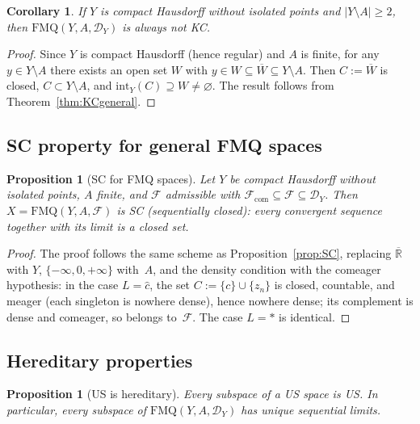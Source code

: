 \documentclass[11pt]{article}
\newtheorem{proposition}[theorem]{Proposition}
\newtheorem{corollary}[theorem]{Corollary}
\theoremstyle{definition}
\theoremstyle{remark}
\begin{document}
\begin{corollary}\label{cor:notKCgeneral}
If $Y$ is compact Hausdorff without isolated points and $|Y \setminus A| \geq 2$, then
$\mathrm{FMQ}(Y, A, \mathcal{D}_Y)$ is always not KC.
\end{corollary}
\begin{proof}
Since $Y$ is compact Hausdorff (hence regular) and $A$ is finite, for any
$y \in Y \setminus A$ there exists an open set $W$ with
$y \in W \subseteq \overline{W} \subseteq Y \setminus A$.
Then $C := \overline{W}$ is closed, $C \subset Y \setminus A$, and
$\mathrm{int}_Y(C) \supseteq W \neq \varnothing$.
The result follows from Theorem~\ref{thm:KCgeneral}.
\end{proof}

\subsection{SC property for general FMQ spaces}

\begin{proposition}[SC for FMQ spaces]\label{prop:SCgeneral}
Let $Y$ be compact Hausdorff without isolated points, $A$ finite, and
$\mathcal{F}$ admissible with
$\mathcal{F}_{\mathrm{com}} \subseteq \mathcal{F} \subseteq \mathcal{D}_Y$.
Then $X = \mathrm{FMQ}(Y, A, \mathcal{F})$ is SC \textup{(sequentially closed):}
every convergent sequence together with its limit is a closed set.
\end{proposition}

\begin{proof}
The proof follows the same scheme as Proposition~\ref{prop:SC},
replacing $\overline{\mathbb{R}}$ with $Y$,
$\{-\infty,0,+\infty\}$ with~$A$, and the density condition with
the comeager hypothesis: in the case $L = \hat{c}$, the set
$C := \{c\} \cup \{z_n\}$ is closed, countable, and meager
(each singleton is nowhere dense), hence nowhere dense; its
complement is dense and comeager, so belongs to~$\mathcal{F}$.
The case $L = \ast$ is identical.
\end{proof}

\subsection{Hereditary properties}

\begin{proposition}[US is hereditary]\label{prop:UShereditary}
Every subspace of a US space is US. In particular, every
subspace of $\mathrm{FMQ}(Y, A, \mathcal{D}_Y)$ has unique sequential limits.
\end{proposition}
\end{document}
